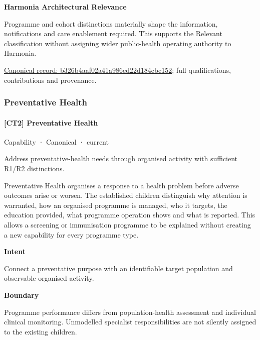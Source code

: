 \textbf{Harmonia Architectural Relevance}



Programme and cohort distinctions materially shape the information, notifications and care enablement required. This supports the Relevant classification without assigning wider public-health operating authority to Harmonia.


{\footnotesize \href{../../../../continuum/strategy/capability/b326b4aaf02a41a986ed22d184cbc152.md}{Canonical record: b326b4aaf02a41a986ed22d184cbc152}; full qualifications, contributions and provenance.}\par
\subsubsection{Preventative Health}

\paragraph{[CT2] Preventative Health}

\label{element:81be04a2d58548a4aea94f9aae90feb6}
{\small Capability · Canonical · current}\par

Address preventative-health needs through organised activity with sufficient R1/R2 distinctions.



Preventative Health organises a response to a health problem before adverse outcomes arise or worsen. The established children distinguish why attention is warranted, how an organised programme is managed, who it targets, the education provided, what programme operation shows and what is reported. This allows a screening or immunisation programme to be explained without creating a new capability for every programme type.



\textbf{Intent}



Connect a preventative purpose with an identifiable target population and observable organised activity.



\textbf{Boundary}



Programme performance differs from population-health assessment and individual clinical monitoring. Unmodelled specialist responsibilities are not silently assigned to the existing children.


